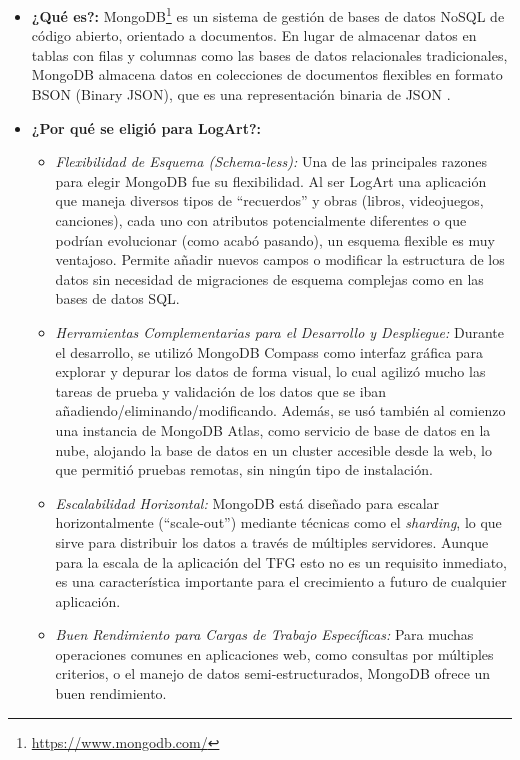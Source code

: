 \begin{itemize}
    \item \textbf{¿Qué es?:} MongoDB\footnote{\url{https://www.mongodb.com/}} es un sistema de gestión de bases de datos NoSQL de código abierto, orientado a documentos. En lugar de almacenar datos en tablas con filas y columnas como las bases de datos relacionales tradicionales, MongoDB almacena datos en colecciones de documentos flexibles en formato BSON (Binary JSON), que es una representación binaria de JSON \cite{aprenderbigdataMongoDB}.
    \item \textbf{¿Por qué se eligió para LogArt?:}
        \begin{itemize}
            \item \textit{Flexibilidad de Esquema (Schema-less):} Una de las principales razones para elegir MongoDB fue su flexibilidad. Al ser LogArt una aplicación que maneja diversos tipos de ``recuerdos'' y obras (libros, videojuegos, canciones), cada uno con atributos potencialmente diferentes o que podrían evolucionar (como acabó pasando), un esquema flexible es muy ventajoso. Permite añadir nuevos campos o modificar la estructura de los datos sin necesidad de migraciones de esquema complejas como en las bases de datos SQL.
            \item \textit{Herramientas Complementarias para el Desarrollo y Despliegue:} Durante el desarrollo, se utilizó MongoDB Compass como interfaz gráfica para explorar y depurar los datos de forma visual, lo cual agilizó mucho las tareas de prueba y validación de los datos que se iban añadiendo/eliminando/modificando. Además, se usó también al comienzo una instancia de MongoDB Atlas, como servicio de base de datos en la nube, alojando la base de datos en un cluster accesible desde la web, lo que permitió pruebas remotas, sin ningún tipo de instalación.
            \item \textit{Escalabilidad Horizontal:} MongoDB está diseñado para escalar horizontalmente (``scale-out'') mediante técnicas como el \textit{sharding}, lo que sirve para distribuir los datos a través de múltiples servidores. Aunque para la escala de la aplicación del TFG esto no es un requisito inmediato, es una característica importante para el crecimiento a futuro de cualquier aplicación.
            \item \textit{Buen Rendimiento para Cargas de Trabajo Específicas:} Para muchas operaciones comunes en aplicaciones web, como consultas por múltiples criterios, o el manejo de datos semi-estructurados, MongoDB ofrece un buen rendimiento.

\end{itemize}
\end{itemize}
